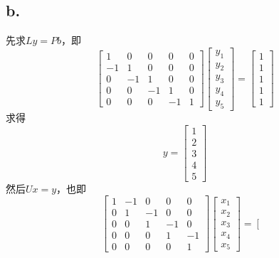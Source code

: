 \documentclass[twocolumn]{article}
\newenvironment{SChinese}{%
	\CJKfamily{gbsn}%
	\CJKtilde
	\CJKnospace}{}
\begin{document}
\begin{CJK}{UTF8}{}
\begin{SChinese}
			\subsection*{b.}
				先求$Ly=Pb$，即\begin{displaymath}
					\left [\begin{matrix}
					1 & 0 & 0 & 0 & 0 \\
					-1 & 1 & 0 & 0 & 0 \\
					0 & -1 & 1 & 0 & 0 \\
					0 & 0 & -1 & 1 & 0 \\
					0 & 0 & 0 & -1 & 1
					\end{matrix}\right]\left [\begin{matrix}
						y_1 \\ y_2 \\ y_3 \\ y_4 \\ y_5
					\end{matrix}\right]=\left [\begin{matrix}
					1 \\ 1 \\ 1 \\ 1 \\ 1
					\end{matrix}\right]
				\end{displaymath}
				求得\begin{displaymath}
					y = \left [\begin{matrix}
					1 \\ 2 \\ 3 \\ 4 \\ 5
					\end{matrix}\right]
				\end{displaymath}
				然后$Ux=y$，也即\begin{displaymath}
					\left [\begin{matrix}
					1 & -1 & 0 & 0 & 0 \\
					0 & 1 & -1 & 0 & 0 \\
					0 & 0 & 1 & -1 & 0 \\
					0 & 0 & 0 & 1 & -1 \\
					0 & 0 & 0 & 0 & 1
					\end{matrix}\right]\left [\begin{matrix}
					x_1 \\ x_2 \\ x_3 \\ x_4 \\ x_5
					\end{matrix}\right]=\left [\begin{matrix}

\end{matrix}
\end{displaymath}
\end{SChinese}
\end{CJK}
\end{document}
